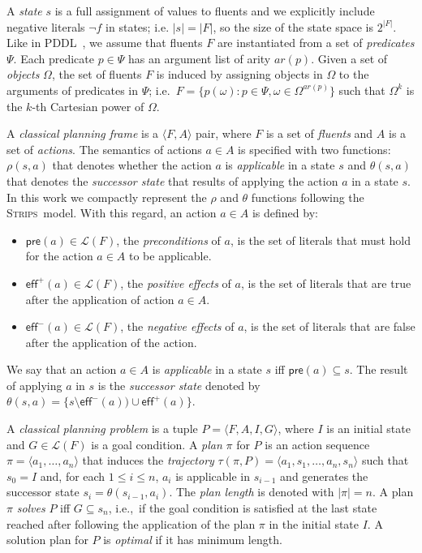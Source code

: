 \documentclass[letterpaper]{article} %
\newcommand{\tup}[1]{{\langle #1 \rangle}}
\newcommand{\pre}{\mathsf{pre}}     %
\newcommand{\eff}{\mathsf{eff}}     %
\newcommand{\strips}{\textsc{Strips}}     %
\begin{document}
A {\em state} $s$ is a full assignment of values to fluents and we explicitly include negative literals $\neg f$ in states; i.e. $|s|=|F|$, so the size of the state space is $2^{|F|}$. Like in PDDL~\cite{fox2003pddl2}, we assume that fluents $F$ are instantiated from a set of {\em predicates} $\Psi$. Each predicate $p\in\Psi$ has an argument list of arity $ar(p)$. Given a set of {\em objects} $\Omega$, the set of fluents $F$ is induced by assigning objects in $\Omega$ to the arguments of predicates in $\Psi$; i.e.~$F=\{p(\omega):p\in\Psi,\omega\in\Omega^{ar(p)}\}$ such that $\Omega^k$ is the $k$-th Cartesian power of $\Omega$.

A {\em classical planning frame} is a $\tup{F,A}$ pair, where $F$ is a set of {\em fluents} and $A$ is a set of {\em actions}. The semantics of actions $a\in A$ is specified with two functions: $\rho(s,a)$ that denotes whether the action $a$ is {\em applicable} in a state $s$ and $\theta(s,a)$ that denotes the {\em successor state} that results of applying the action $a$ in a state $s$. In this work we compactly represent the $\rho$ and $\theta$ functions following the \strips\ model. With this regard, an action $a\in A$ is defined by:
\begin{itemize}
\item $\pre(a)\in\mathcal{L}(F)$, the {\em preconditions} of $a$, is the set of literals that must hold for the action $a\in A$ to be applicable.
\item $\eff^+(a)\in\mathcal{L}(F)$, the {\em positive effects} of $a$, is the set of literals that are true after the application of action $a\in A$.
\item $\eff^-(a)\in\mathcal{L}(F)$, the {\em negative effects} of $a$, is the set of literals that are false after the application of the action.
\end{itemize}
We say that an action $a\in A$ is {\em applicable} in a state $s$ iff $\pre(a)\subseteq s$. The result of applying $a$ in $s$ is the {\em successor state} denoted by $\theta(s,a)=\{s\setminus\eff^-(a))\cup\eff^+(a)\}$.

A {\em classical planning problem} is a tuple $P=\tup{F,A,I,G}$, where $I$ is an initial state and $G\in\mathcal{L}(F)$ is a goal condition. A {\em plan} $\pi$ for $P$ is an action sequence $\pi=\tup{a_1, \ldots, a_n}$ that induces the {\em trajectory} $\tau(\pi,P)=\tup{a_1, s_1, \ldots, a_n, s_n}$ such that $s_0=I$ and, for each {\small $1\leq i\leq n$}, $a_i$ is applicable in $s_{i-1}$ and generates the successor state $s_i=\theta(s_{i-1},a_i)$. The {\em plan length} is denoted with $|\pi|=n$. A plan $\pi$ {\em solves} $P$ iff $G\subseteq s_n$, i.e.,~if the goal condition is satisfied at the last state reached after following the application of the plan $\pi$ in the initial state $I$. A solution plan for $P$ is {\em optimal} if it has minimum length.
\end{document}

